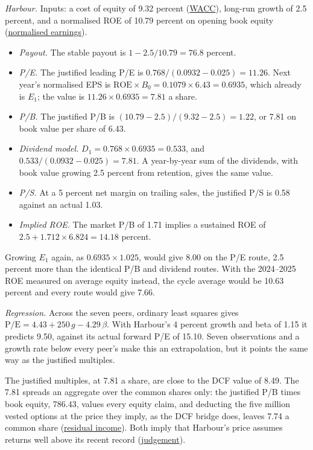 \begin{qfmethod}
 \emph{Harbour.} Inputs: a cost of equity of 9.32 percent (\hyperref[meth:wacc-calculation]{WACC}), long-run growth of 2.5 percent, and a normalised ROE of 10.79 percent on opening book equity (\hyperref[meth:normalised-earnings]{normalised earnings}).
\begin{itemize}
\item \emph{Payout.} The stable payout is $1-2.5/10.79=76.8$ percent.
\item \emph{P/E.} The justified leading P/E is $0.768/(0.0932-0.025)=11.26$. Next year's normalised EPS is $\mathrm{ROE}\times B_0=0.1079\times6.43=0.6935$, which already is $E_1$; the value is $11.26\times0.6935=7.81$ a share.
\item \emph{P/B.} The justified P/B is $(10.79-2.5)/(9.32-2.5)=1.22$, or 7.81 on book value per share of 6.43.
\item \emph{Dividend model.} $D_1=0.768\times0.6935=0.533$, and $0.533/(0.0932-0.025)=7.81$. A year-by-year sum of the dividends, with book value growing 2.5 percent from retention, gives the same value.
\item \emph{P/S.} At a 5 percent net margin on trailing sales, the justified P/S is 0.58 against an actual 1.03.
\item \emph{Implied ROE.} The market P/B of 1.71 implies a sustained ROE of $2.5+1.712\times6.824=14.18$ percent.
\end{itemize}
Growing $E_1$ again, as $0.6935\times1.025$, would give 8.00 on the P/E route, 2.5 percent more than the identical P/B and dividend routes. With the 2024--2025 ROE measured on average equity instead, the cycle average would be 10.63 percent and every route would give 7.66.

\emph{Regression.} Across the seven peers, ordinary least squares gives $\mathrm{P/E}=4.43+250\,g-4.29\,\beta$. With Harbour's 4 percent growth and beta of 1.15 it predicts 9.50, against its actual forward P/E of 15.10. Seven observations and a growth rate below every peer's make this an extrapolation, but it points the same way as the justified multiples.

The justified multiples, at 7.81 a share, are close to the DCF value of 8.49. The 7.81 spreads an aggregate over the common shares only: the justified P/B times book equity, 786.43, values every equity claim, and deducting the five million vested options at the price they imply, as the DCF bridge does, leaves 7.74 a common share (\hyperref[meth:residual-income-valuation]{residual income}). Both imply that Harbour's price assumes returns well above its recent record (\hyperref[meth:valuation-price-judgement]{judgement}).


\end{qfmethod}
